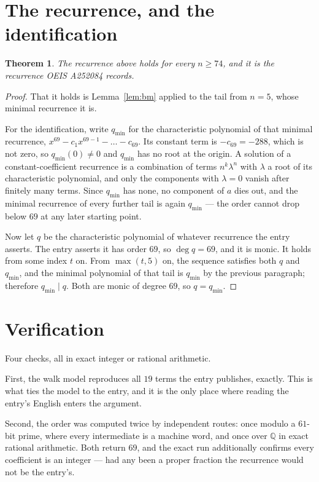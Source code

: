 \documentclass[11pt,a4paper]{article}
\theoremstyle{plain}
\newtheorem{theorem}{Theorem}
\theoremstyle{definition}
\begin{document}
\section{The recurrence, and the identification}

\begin{theorem}
The recurrence above holds for every $n\ge74$, and it is the recurrence OEIS A252084 records.
\end{theorem}

\begin{proof}
That it holds is Lemma~\ref{lem:bm} applied to the tail from $n=5$, whose minimal
recurrence it is.

For the identification, write $q_{\min}$ for the characteristic polynomial of that minimal
recurrence, $x^{69}-c_1x^{69-1}-\dots-c_{69}$. Its constant term is
$-c_{69}=-288$, which is not zero, so $q_{\min}(0)\neq0$ and $q_{\min}$ has no
root at the origin. A solution of a constant-coefficient recurrence is a combination of terms
$n^{k}\lambda^{n}$ with $\lambda$ a root of its characteristic polynomial, and only the
components with $\lambda=0$ vanish after finitely many terms. Since $q_{\min}$ has none, no
component of $a$ dies out, and the minimal recurrence of every further tail is again
$q_{\min}$ --- the order cannot drop below $69$ at any later starting point.

Now let $q$ be the characteristic polynomial of whatever recurrence the entry asserts. The
entry asserts it has order $69$, so $\deg q=69$, and it is monic. It holds from some
index $t$ on. From $\max(t,5)$ on, the sequence satisfies both $q$ and $q_{\min}$, and
the minimal polynomial of that tail is $q_{\min}$ by the previous paragraph; therefore
$q_{\min}\mid q$. Both are monic of degree $69$, so $q=q_{\min}$.
\end{proof}

\section{Verification}

Four checks, all in exact integer or rational arithmetic.

First, the walk model reproduces all $19$ terms the entry publishes, exactly. This is
what ties the model to the entry, and it is the only place where reading the entry's English
enters the argument.

Second, the order was computed twice by independent routes: once modulo a $61$-bit prime, where
every intermediate is a machine word, and once over $\mathbb{Q}$ in exact rational arithmetic.
Both return $69$, and the exact run additionally confirms every coefficient is an integer
--- had any been a proper fraction the recurrence would not be the entry's.
\end{document}
